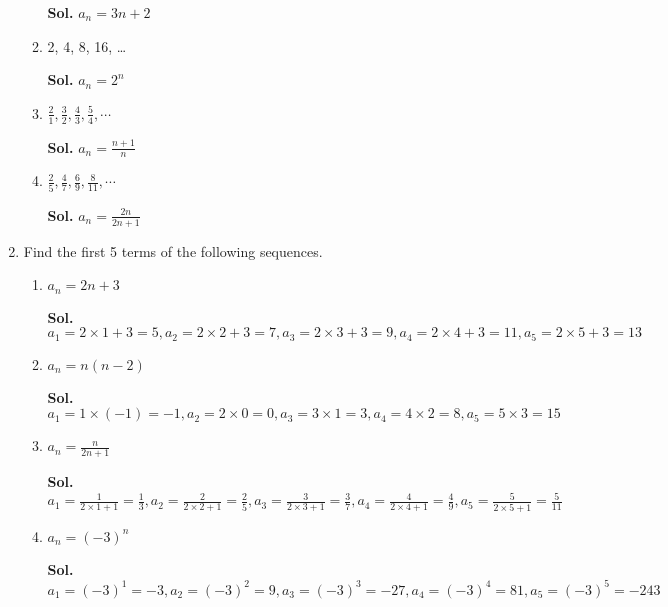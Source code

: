 \documentclass{report}
\begin{document}
\begin{multicols}{2}
\begin{enumerate}
\begin{enumerate}
                  \textbf{Sol.} $a_{n} = 3n+2$

            \item 2, 4, 8, 16, \ldots

                  \textbf{Sol.} $a_{n} = 2^{n}$

            \item $\frac{2}{1}, \frac{3}{2}, \frac{4}{3}, \frac{5}{4}, \cdots$

                  \textbf{Sol.} $a_{n} = \frac{n+1}{n}$

            \item $\frac{2}{5}, \frac{4}{7}, \frac{6}{9}, \frac{8}{11}, \cdots$

                  \textbf{Sol.} $a_{n} = \frac{2n}{2n+1}$
          \end{enumerate}

    \item Find the first 5 terms of the following sequences.

          \begin{enumerate}
            \item $a_{n} = 2n+3$

                  \textbf{Sol.}
                  $a_{1} = 2\times1+3 = 5, a_{2} = 2\times2+3 = 7, a_{3} = 2\times3+3 = 9, a_{4}
                    = 2\times4+3 = 11, a_{5} = 2\times5+3 = 13$

            \item $a_{n} = n(n-2)$

                  \textbf{Sol.}
                  $a_{1} = 1\times(-1) = -1, a_{2} = 2\times0 = 0, a_{3} = 3\times1 = 3, a_{4}
                    = 4\times2 = 8, a_{5} = 5\times3 = 15$

            \item $a_{n} = \frac{n}{2n+1}$

                  \textbf{Sol.}
                  $a_{1} = \frac{1}{2\times1+1}= \frac{1}{3}, a_{2} = \frac{2}{2\times2+1}= \frac{2}{5}
                    , a_{3} = \frac{3}{2\times3+1}= \frac{3}{7}, a_{4} = \frac{4}{2\times4+1}=
                    \frac{4}{9}, a_{5} = \frac{5}{2\times5+1}= \frac{5}{11}$

            \item $a_{n} = (-3)^{n}$

                  \textbf{Sol.}
                  $a_{1} = (-3)^{1} = -3, a_{2} = (-3)^{2} = 9, a_{3} = (-3)^{3} = -27, a_{4}
                    = (-3)^{4} = 81, a_{5} = (-3)^{5} = -243$
          \end{enumerate}


\end{enumerate}
\end{multicols}
\end{document}
